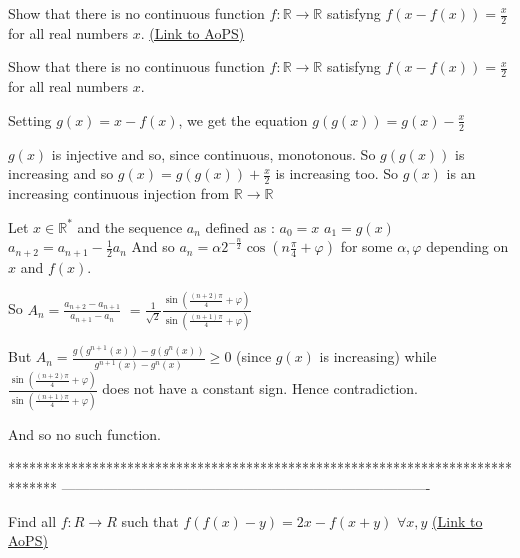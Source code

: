 \begin{problem}
	Show that there is no continuous function $f: \mathbb{R}\to\mathbb{R}$ satisfyng $f(x-f(x))=\frac{x}{2}$ for all real numbers $x$.
	\flushright \href{https://artofproblemsolving.com/community/c6h569283}{(Link to AoPS)}
\end{problem}



\begin{solution}
	\begin{tcolorbox}Show that there is no continuous function $f: \mathbb{R}\to\mathbb{R}$ satisfyng $f(x-f(x))=\frac{x}{2}$ for all real numbers $x$.\end{tcolorbox}
Setting $g(x)=x-f(x)$, we get the equation $g(g(x))=g(x)-\frac x2$

$g(x)$ is injective and so, since continuous, monotonous. So $g(g(x))$ is increasing and so $g(x)=g(g(x))+\frac x2$ is increasing too.
So $g(x)$ is an increasing continuous injection from $\mathbb R\to\mathbb R$

Let $x\in\mathbb R^*$ and the sequence $a_n$ defined as :
$a_0=x$
$a_1=g(x)$
$a_{n+2}=a_{n+1}-\frac 12a_n$
And so $a_n=\alpha 2^{-\frac n2}\cos(n\frac{\pi}4+\varphi)$ for some $\alpha,\varphi$ depending on $x$ and $f(x)$.

So $A_n=\frac{a_{n+2}-a_{n+1}}{a_{n+1}-a_n}$ $=\frac 1{\sqrt 2}\frac{\sin(\frac{(n+2)\pi}4+\varphi)}{\sin(\frac{(n+1)\pi}4+\varphi)}$

But $A_n=\frac{g(g^{n+1}(x))-g(g^n(x))}{g^{n+1}(x)-g^n(x)}\ge 0$ (since $g(x)$ is increasing) while $\frac{\sin(\frac{(n+2)\pi}4+\varphi)}{\sin(\frac{(n+1)\pi}4+\varphi)}$ does not have a constant sign.
Hence contradiction.

And so no such function.
\end{solution}
*******************************************************************************
-------------------------------------------------------------------------------

\begin{problem}
	Find all $ f: R \to R $ such that $ f(f(x)-y) = 2x - f(x+y)$    $ \forall x,y$
	\flushright \href{https://artofproblemsolving.com/community/c6h569288}{(Link to AoPS)}
\end{problem}



